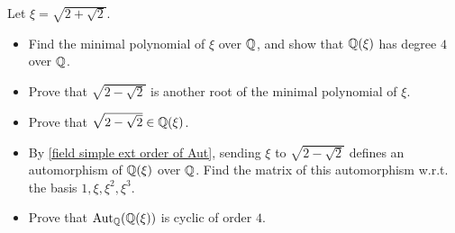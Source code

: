 \begin{exercise}\label{field ext eg sqrt(2+sqrt(2))}
Let $\xi=\sqrt{2+\sqrt{2}}$.
\begin{itemize}
\item Find the minimal polynomial of $\xi$ over $\mathbb{Q}$, and show that $\mathbb{Q}(\xi)$ has degree $4$ over
$\mathbb{Q}$.
\item Prove that $\sqrt{2-\sqrt{2}}$ is another root of the minimal polynomial of $\xi$.
\item Prove that $\sqrt{2-\sqrt{2}}\in\mathbb{Q}(\xi)$.
\item By \cref{field simple ext order of Aut}, sending $\xi$ to $\sqrt{2-\sqrt{2}}$ defines an automorphism of $\mathbb{Q}(\xi)$ over $\mathbb{Q}$. Find the matrix of this automorphism w.r.t. the basis $1,\xi,\xi^2,\xi^3$.
\item Prove that $\mathrm{Aut}_{\mathbb{Q}}(\mathbb{Q}(\xi))$ is cyclic of order $4$.
\end{itemize}
\end{exercise}
